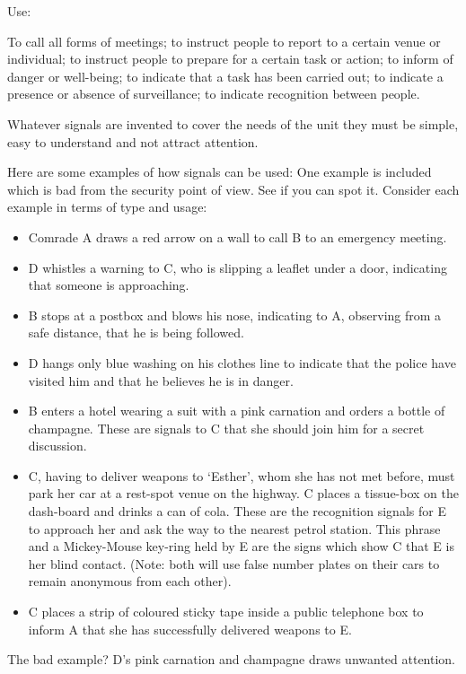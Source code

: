 {Use:}

To call all forms of meetings; to instruct people to report to a certain
venue or individual; to instruct people to prepare for a certain task or
action; to inform of danger or well-being; to indicate that a task has
been carried out; to indicate a presence or absence of surveillance; to
indicate recognition between people.

Whatever signals are invented to cover the needs of the unit they must
be simple, easy to understand and not attract attention.

Here are some examples of how signals can be used: One example is
included which is bad from the security point of view. See if you can
spot it. Consider each example in terms of type and usage:

\begin{itemize}
\tightlist
\item
  Comrade A draws a red arrow on a wall to call B to an emergency
  meeting.
\item
  D whistles a warning to C, who is slipping a leaflet under a door,
  indicating that someone is approaching.
\item
  B stops at a postbox and blows his nose, indicating to A, observing
  from a safe distance, that he is being followed.
\item
  D hangs only blue washing on his clothes line to indicate that the
  police have visited him and that he believes he is in danger.
\item
  B enters a hotel wearing a suit with a pink carnation and orders a
  bottle of champagne. These are signals to C that she should join him
  for a secret discussion.
\item
  C, having to deliver weapons to `Esther', whom she has not met before,
  must park her car at a rest-spot venue on the highway. C places a
  tissue-box on the dash-board and drinks a can of cola. These are the
  recognition signals for E to approach her and ask the way to the
  nearest petrol station. This phrase and a Mickey-Mouse key-ring held
  by E are the signs which show C that E is her blind contact. (Note:
  both will use false number plates on their cars to remain anonymous
  from each other).
\item
  C places a strip of coloured sticky tape inside a public telephone box
  to inform A that she has successfully delivered weapons to E.
\end{itemize}

The bad example? D's pink carnation and champagne draws unwanted
attention.

